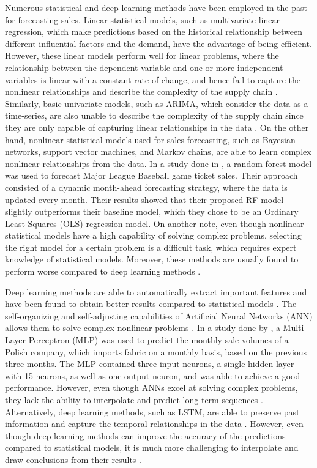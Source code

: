 Numerous statistical and deep learning methods have been employed in the past for forecasting sales.
Linear statistical models, such as multivariate linear regression, which make predictions based on the historical relationship between different influential factors and the demand, have the advantage of being efficient. 
However, these linear models perform well for linear problems, where the relationship between the dependent variable and one or more independent variables is linear with a constant rate of change, and hence fail to capture the nonlinear relationships and describe the complexity of the supply chain \cite{c5}.
Similarly, basic univariate models, such as ARIMA, which consider the data as a time-series, are also unable to describe the complexity of the supply chain since they are only capable of capturing linear relationships in the data \cite{c5, c1}.
On the other hand, nonlinear statistical models used for sales forecasting, such as Bayesian networks, support vector machines, and Markov chains, are able to learn complex nonlinear relationships from the data.
In a study done in \cite{c10}, a random forest model was used to forecast Major League Baseball game ticket sales.
Their approach consisted of a dynamic month-ahead forecasting strategy, where the data is updated every month. 
Their results showed that their proposed RF model slightly outperforms their baseline model, which they chose to be an Ordinary Least Squares (OLS) regression model.
On another note, even though nonlinear statistical models have a high capability of solving complex problems, selecting the right model for a certain problem is a difficult task, which requires expert knowledge of statistical models. 
Moreover, these methods are usually found to perform worse compared to deep learning methods \cite{c5}. 

Deep learning methods are able to automatically extract important features and have been found to obtain better results compared to statistical models \cite{c5}. 
The self-organizing and self-adjusting capabilities of Artificial Neural Networks (ANN) allows them to solve complex nonlinear problems \cite{c7}.  
In a study done by \cite{c9}, a Multi-Layer Perceptron (MLP) was used to predict the monthly sale volumes of a Polish company, which imports fabric on a monthly basis, based on the previous three months.
The MLP contained three input neurons, a single hidden layer with 15 neurons, as well as one output neuron, and was able to achieve a good performance.
However, even though ANNs excel at solving complex problems, they lack the ability to interpolate and predict long-term sequences \cite{c7}.
Alternatively, deep learning methods, such as LSTM, are able to preserve past information and capture the temporal relationships in the data \cite{c6}.
However, even though deep learning methods can improve the accuracy of the predictions compared to statistical models, it is much more challenging to interpolate and draw conclusions from their results \cite{c5, c9}. 

